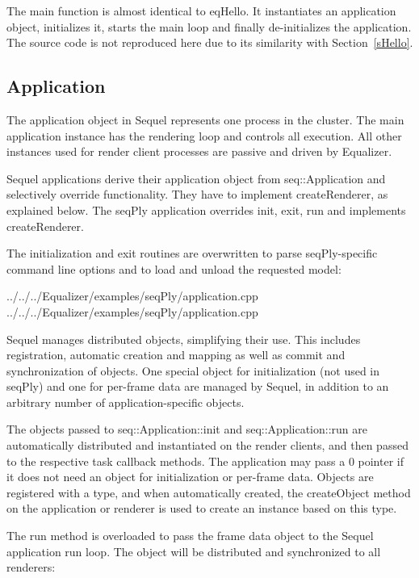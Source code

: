 \documentclass[10pt,a4]{scrartcl}
\newcommand{\sref}[1]{Section~\ref{#1}}
\begin{document}
The main function is almost identical to \textsf{eqHello}. It instantiates an
application object, initializes it, starts the main loop and finally
de-initializes the application. The source code is not reproduced here due to
its similarity with \sref{sHello}.

\subsection{Application}

The application object in Sequel represents one process in the cluster. The main
application instance has the rendering loop and controls all execution. All
other instances used for render client processes are passive and driven by
Equalizer.

Sequel applications derive their application object from
\textsf{seq::Application} and selectively override functionality. They have to
implement \textsf{createRenderer}, as explained below. The \textsf{seqPly}
application overrides init, exit, run and implements createRenderer.

The initialization and exit routines are overwritten to parse
\textsf{seqPly}-specific command line options and to load and unload the
requested model:

{\footnotesize
  {../../../Equalizer/examples/seqPly/application.cpp}}
{\footnotesize
  {../../../Equalizer/examples/seqPly/application.cpp}}

Sequel manages distributed objects, simplifying their use. This includes
registration, automatic creation and mapping as well as commit and
synchronization of objects. One special object for initialization (not used in
\textsf{seqPly}) and one for per-frame data are managed by Sequel, in addition
to an arbitrary number of application-specific objects.

The objects passed to \textsf{seq::Application::init} and
\textsf{seq::Application::run} are automatically distributed and instantiated on
the render clients, and then passed to the respective task callback methods. The
application may pass a 0 pointer if it does not need an object for
initialization or per-frame data. Objects are registered with a type, and when
automatically created, the \textsf{createObject} method on the application or
renderer is used to create an instance based on this type.

The run method is overloaded to pass the frame data object to the Sequel
application run loop. The object will be distributed and synchronized to all
renderers:
\end{document}
